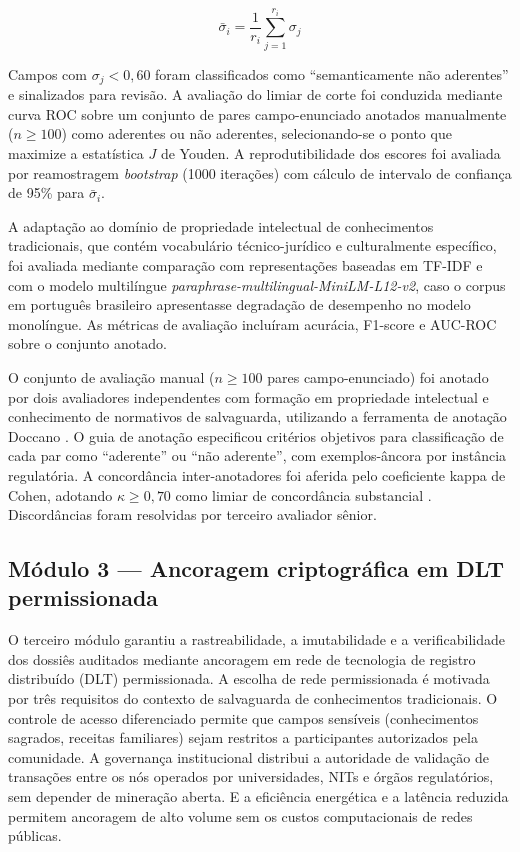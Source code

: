 \documentclass[preprint,12pt,authoryear]{elsarticle}
\begin{document}
\begin{equation}
\bar{\sigma}_i = \frac{1}{r_i} \sum_{j=1}^{r_i} \sigma_j
\label{eq:sigma_mean_cap5}
\end{equation}

Campos com $\sigma_j < 0{,}60$ foram classificados como ``semanticamente não aderentes'' e sinalizados para revisão. A avaliação do limiar de corte foi conduzida mediante curva ROC sobre um conjunto de pares campo-enunciado anotados manualmente ($n \geq 100$) como aderentes ou não aderentes, selecionando-se o ponto que maximize a estatística $J$ de Youden. A reprodutibilidade dos escores foi avaliada por reamostragem \textit{bootstrap} (1000 iterações) com cálculo de intervalo de confiança de 95\% para $\bar{\sigma}_i$.

A adaptação ao domínio de propriedade intelectual de conhecimentos tradicionais, que contém vocabulário técnico-jurídico e culturalmente específico, foi avaliada mediante comparação com representações baseadas em TF-IDF e com o modelo multilíngue \textit{paraphrase-multilingual-MiniLM-L12-v2}, caso o corpus em português brasileiro apresentasse degradação de desempenho no modelo monolíngue. As métricas de avaliação incluíram acurácia, F1-score e AUC-ROC sobre o conjunto anotado.

O conjunto de avaliação manual ($n \geq 100$ pares campo-enunciado) foi anotado por dois avaliadores independentes com formação em propriedade intelectual e conhecimento de normativos de salvaguarda, utilizando a ferramenta de anotação Doccano \citep{Nakayama2018}. O guia de anotação especificou critérios objetivos para classificação de cada par como ``aderente'' ou ``não aderente'', com exemplos-âncora por instância regulatória. A concordância inter-anotadores foi aferida pelo coeficiente kappa de Cohen, adotando $\kappa \geq 0{,}70$ como limiar de concordância substancial \citep{Landis1977}. Discordâncias foram resolvidas por terceiro avaliador sênior.

\subsection{Módulo 3 --- Ancoragem criptográfica em DLT permissionada}
\label{subsec:dlt_cap5}

O terceiro módulo garantiu a rastreabilidade, a imutabilidade e a verificabilidade dos dossiês auditados mediante ancoragem em rede de tecnologia de registro distribuído (DLT) permissionada. A escolha de rede permissionada é motivada por três requisitos do contexto de salvaguarda de conhecimentos tradicionais. O controle de acesso diferenciado permite que campos sensíveis (conhecimentos sagrados, receitas familiares) sejam restritos a participantes autorizados pela comunidade. A governança institucional distribui a autoridade de validação de transações entre os nós operados por universidades, NITs e órgãos regulatórios, sem depender de mineração aberta. E a eficiência energética e a latência reduzida permitem ancoragem de alto volume sem os custos computacionais de redes públicas.
\end{document}
